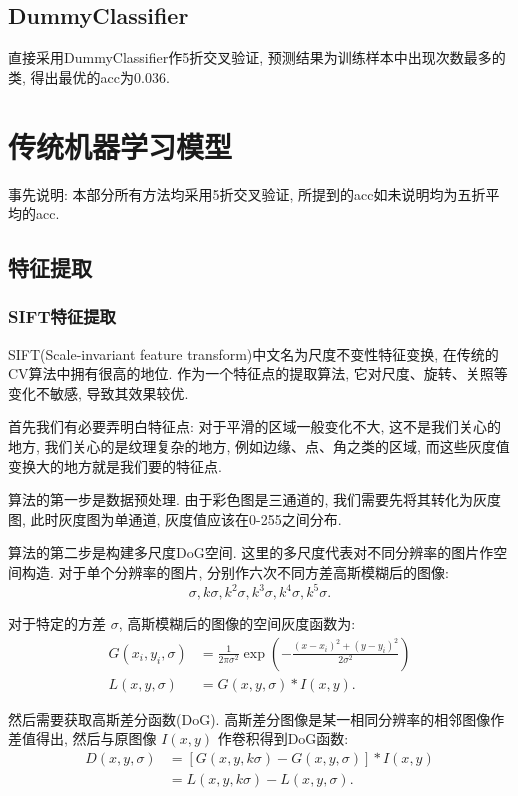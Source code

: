 \documentclass[lang=cn,12pt,a4paper,cite=authoryear]{elegantpaper}
\begin{document}
\subsection{DummyClassifier}
直接采用DummyClassifier作5折交叉验证, 预测结果为训练样本中出现次数最多的类, 得出最优的acc为0.036.
\section{传统机器学习模型}
事先说明: 本部分所有方法均采用5折交叉验证, 所提到的acc如未说明均为五折平均的acc.
\subsection{特征提取}
\subsubsection{SIFT特征提取}
SIFT(Scale-invariant feature transform)中文名为尺度不变性特征变换, 在传统的CV算法中拥有很高的地位. 作为一个特征点的提取算法, 它对尺度、旋转、关照等变化不敏感, 导致其效果较优.

首先我们有必要弄明白特征点: 对于平滑的区域一般变化不大, 这不是我们关心的地方, 我们关心的是纹理复杂的地方, 例如边缘、点、角之类的区域, 而这些灰度值变换大的地方就是我们要的特征点.

算法的第一步是数据预处理. 由于彩色图是三通道的, 我们需要先将其转化为灰度图, 此时灰度图为单通道, 灰度值应该在0-255之间分布.

算法的第二步是构建多尺度DoG空间. 这里的多尺度代表对不同分辨率的图片作空间构造. 对于单个分辨率的图片, 分别作六次不同方差高斯模糊后的图像:
\begin{equation*}
    \sigma, k\sigma, k^2\sigma, k^3\sigma, k^4\sigma, k^5\sigma.
\end{equation*}

对于特定的方差 $\sigma$, 高斯模糊后的图像的空间灰度函数为:
\begin{equation*}
\begin{aligned}
    G(x_i, y_i, \sigma) &= \frac{1}{2\pi \sigma^2}\exp{\left(-\frac{(x-x_i)^2+(y-y_i)^2}{2\sigma^2}\right)}\\
    L(x, y, \sigma) &= G(x, y, \sigma) * I(x, y).
\end{aligned}
\end{equation*}

然后需要获取高斯差分函数(DoG). 高斯差分图像是某一相同分辨率的相邻图像作差值得出, 然后与原图像 $I(x, y)$ 作卷积得到DoG函数:
\begin{equation*}
\begin{aligned}
    D(x, y, \sigma) &= \left[G(x, y, k\sigma)-G(x, y, \sigma)\right] * I(x, y)\\
    &=L(x, y, k\sigma) - L(x, y, \sigma).
\end{aligned}
\end{equation*}
\end{document}
